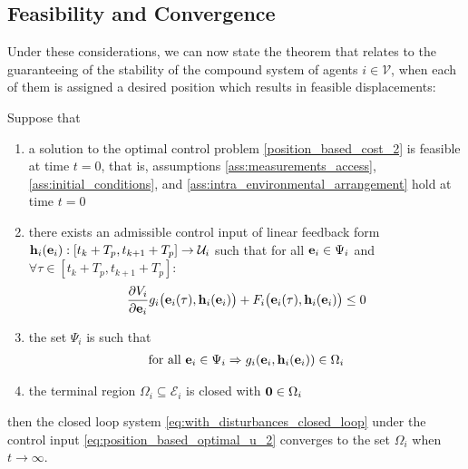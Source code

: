 \subsection{Feasibility and Convergence}

Under these considerations, we can now state the theorem that relates to
the guaranteeing of the stability of the compound system of agents
$i \in \mathcal{V}$, when each of them is assigned a desired
position which results in feasible displacements:\\

\begin{bw_box}
\begin{theorem}

  Suppose that

  \begin{enumerate}
    \item a solution to the optimal control problem \eqref{position_based_cost_2}
      is feasible at time $t=0$, that is, assumptions
      \eqref{ass:measurements_access}, \eqref{ass:initial_conditions}, and
      \eqref{ass:intra_environmental_arrangement} hold at time $t=0$
    \item there exists an admissible control input of linear feedback form
      $\bm{\mathbf{h}}_i(\bm{\mathbf{e}}_i) : [t_k + T_p, t_{k+1} + T_p] \to \mathcal{U}_i$
      such that for all $\bm{\mathbf{e}}_i \in \Psi_i$ and $\forall \tau \in
      [t_k + T_p, t_{k+1} + T_p]$:
      \begin{align}
        \dfrac{\partial V_i}{\partial \bm{\mathbf{e}}_i} g_i\big(\bm{\mathbf{e}}_i(\tau), \bm{\mathbf{h}}_i(\bm{\mathbf{e}}_i)\big)
          + F_i\big(\bm{\mathbf{e}}_i(\tau), \bm{\mathbf{h}}_i(\bm{\mathbf{e}}_i)\big) \leq 0
      \end{align}
    \item the set $\Psi_i$ is such that
      \begin{align}
        \text{for all } \bm{\mathbf{e}}_i \in \Psi_i \Rightarrow g_i(\bm{\mathbf{e}}_i, \bm{\mathbf{h}}_i(\bm{\mathbf{e}}_i)) \in \Omega_i
      \end{align}
    \item the terminal region $\Omega_i \subseteq \mathcal{E}_i$ is
      closed with $\bm{\mathbf{0}} \in \Omega_i$

  \end{enumerate}

  then the closed loop system \eqref{eq:with_disturbances_closed_loop} under
  the control input \eqref{eq:position_based_optimal_u_2} converges to the set
  $\Omega_i$ when $t \to \infty$.
  \label{theorem:with_disturbances}
\end{theorem}
\end{bw_box}

